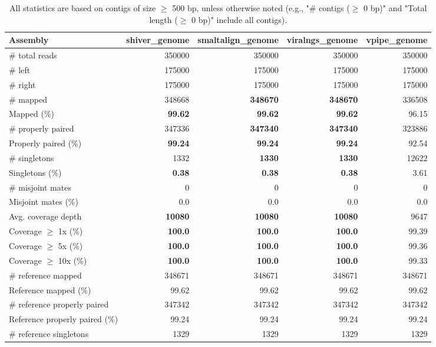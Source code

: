 \documentclass[12pt,a4paper]{article}
\begin{document}
\begin{table}[ht]
\begin{center}
\caption{All statistics are based on contigs of size $\geq$ 500 bp, unless otherwise noted (e.g., "\# contigs ($\geq$ 0 bp)" and "Total length ($\geq$ 0 bp)" include all contigs).}
\begin{tabular}{|l*{4}{|r}|}
\hline
Assembly & shiver\_genome & smaltalign\_genome & viralngs\_genome & vpipe\_genome \\ \hline
\# total reads & 350000 & 350000 & 350000 & 350000 \\ \hline
\# left & 175000 & 175000 & 175000 & 175000 \\ \hline
\# right & 175000 & 175000 & 175000 & 175000 \\ \hline
\# mapped & 348668 & {\bf 348670} & {\bf 348670} & 336508 \\ \hline
Mapped (\%) & {\bf 99.62} & {\bf 99.62} & {\bf 99.62} & 96.15 \\ \hline
\# properly paired & 347336 & {\bf 347340} & {\bf 347340} & 323886 \\ \hline
Properly paired (\%) & {\bf 99.24} & {\bf 99.24} & {\bf 99.24} & 92.54 \\ \hline
\# singletons & 1332 & {\bf 1330} & {\bf 1330} & 12622 \\ \hline
Singletons (\%) & {\bf 0.38} & {\bf 0.38} & {\bf 0.38} & 3.61 \\ \hline
\# misjoint mates & 0 & 0 & 0 & 0 \\ \hline
Misjoint mates (\%) & 0.0 & 0.0 & 0.0 & 0.0 \\ \hline
Avg. coverage depth & {\bf 10080} & {\bf 10080} & {\bf 10080} & 9647 \\ \hline
Coverage $\geq$ 1x (\%) & {\bf 100.0} & {\bf 100.0} & {\bf 100.0} & 99.39 \\ \hline
Coverage $\geq$ 5x (\%) & {\bf 100.0} & {\bf 100.0} & {\bf 100.0} & 99.36 \\ \hline
Coverage $\geq$ 10x (\%) & {\bf 100.0} & {\bf 100.0} & {\bf 100.0} & 99.33 \\ \hline
\# reference mapped & 348671 & 348671 & 348671 & 348671 \\ \hline
Reference mapped (\%) & 99.62 & 99.62 & 99.62 & 99.62 \\ \hline
\# reference properly paired & 347342 & 347342 & 347342 & 347342 \\ \hline
Reference properly paired (\%) & 99.24 & 99.24 & 99.24 & 99.24 \\ \hline
\# reference singletons & 1329 & 1329 & 1329 & 1329 \\ \hline

\end{tabular}
\end{center}
\end{table}
\end{document}
